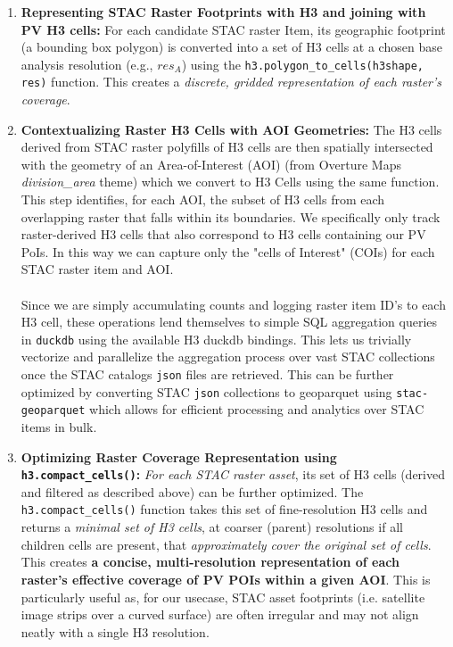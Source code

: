 \begin{enumerate}
    \item \textbf{Representing STAC Raster Footprints with H3 and joining with PV H3 cells:}
        For each candidate STAC raster Item, its geographic footprint (a bounding box polygon) is converted into a set of H3 cells at a chosen base analysis resolution (e.g., $res_A$) using the \texttt{h3.polygon\_to\_cells(h3shape, res)} function. 
        This creates a \textit{discrete, gridded representation of each raster's coverage}.

    \item \textbf{Contextualizing Raster H3 Cells with AOI Geometries:}
        The H3 cells derived from STAC raster polyfills of H3 cells are then spatially intersected with the geometry of an Area-of-Interest (AOI) (from Overture Maps \textit{division\_area} theme) which we convert to H3 Cells using the same function. 
        This step identifies, for each AOI, the subset of H3 cells from each overlapping raster that falls within its boundaries. We specifically only track raster-derived H3 cells that also correspond to H3 cells containing our PV PoIs. 
        In this way we can capture only the "cells of Interest" (COIs) for each STAC raster item and AOI.
        \\
        \\
        Since we are simply accumulating counts and logging raster item ID's to each H3 cell, these operations lend themselves to simple SQL aggregation queries in \texttt{duckdb} using the available H3 duckdb bindings. 
        This lets us trivially vectorize and parallelize the aggregation process over vast STAC collections once the STAC catalogs \texttt{json} files are retrieved. 
        This can be further optimized by converting STAC \texttt{json} collections to geoparquet using \texttt{stac-geoparquet} which allows for efficient processing and analytics over STAC items in bulk. 

    \item \textbf{Optimizing Raster Coverage Representation using \texttt{h3.compact\_cells()}:}
        \textit{For each STAC raster asset}, its set of H3 cells (derived and filtered as described above) can be further optimized.
        The \texttt{h3.compact\_cells()} function takes this set of fine-resolution H3 cells and returns a \textit{minimal set of H3 cells}, at coarser (parent) resolutions if all children cells are present, that \textit{approximately cover the original set of cells}.
        This creates \textbf{a concise, multi-resolution representation of each raster's effective coverage of PV POIs within a given AOI}. 
        This is particularly useful as, for our usecase, STAC asset footprints (i.e. satellite image strips over a curved surface) are often irregular and may not align neatly with a single H3 resolution. 


\end{enumerate}

